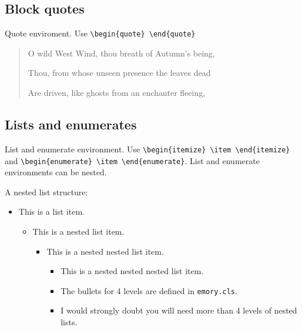 \documentclass[draft,twoside]{emory}
\begin{document}
\subsection{Block quotes}
Quote enviroment. Use \verb|\begin{quote} \end{quote}|

\begin{quote}\label{poet}
O wild West Wind, thou breath of Autumn’s being,

Thou, from whose unseen presence the leaves dead

Are driven, like ghosts from an enchanter fleeing,
\end{quote}

\subsection{Lists and enumerates}
List and enumerate environment. Use \verb|\begin{itemize} \item \end{itemize}|
and \verb|\begin{enumerate} \item \end{enumerate}|. List and enumerate environments
can be nested.

A nested list structure:
\begin{itemize}
  \item This is a list item.
  \begin{itemize}
    \item This is a nested list item.
    \begin{itemize}
      \item This is a nested nested list item.
      \begin{itemize}
        \item This is a nested nested nested list item. 
        \item The bullets for 4 levels are defined in \verb|emory.cls|.
        \item I would strongly doubt you will need more than 4 levels of nested lists.
      \end{itemize}
    \end{itemize}
  \end{itemize}    
\end{itemize}
\end{document}
